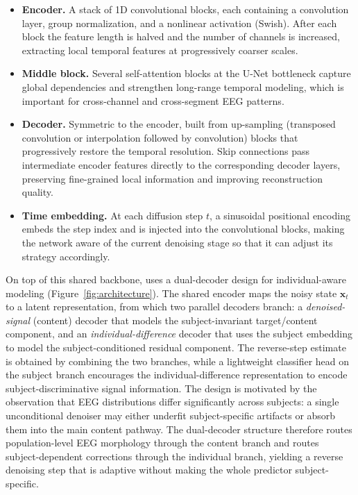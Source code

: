 \begin{itemize}
  \item \textbf{Encoder.} A stack of 1D convolutional blocks, each containing a
  convolution layer, group normalization, and a nonlinear activation (Swish).
  After each block the feature length is halved and the number of channels is
  increased, extracting local temporal features at progressively coarser scales.
  \item \textbf{Middle block.} Several self-attention blocks at the U-Net
  bottleneck capture global dependencies and strengthen long-range temporal
  modeling, which is important for cross-channel and cross-segment EEG patterns.
  \item \textbf{Decoder.} Symmetric to the encoder, built from up-sampling
  (transposed convolution or interpolation followed by convolution) blocks that
  progressively restore the temporal resolution. Skip connections pass
  intermediate encoder features directly to the corresponding decoder layers,
  preserving fine-grained local information and improving reconstruction
  quality.
  \item \textbf{Time embedding.} At each diffusion step $t$, a sinusoidal
  positional encoding embeds the step index and is injected into the
  convolutional blocks, making the network aware of the current denoising stage
  so that it can adjust its strategy accordingly.
\end{itemize}

On top of this shared backbone, \saddpm{} uses a dual-decoder design for
individual-aware modeling (Figure~\ref{fig:architecture}). The shared encoder
maps the noisy state $\mathbf{x}_t$ to a latent representation, from which two
parallel decoders branch: a \emph{denoised-signal} (content) decoder that models
the subject-invariant target/content component, and an
\emph{individual-difference} decoder that uses the subject embedding to model the
subject-conditioned residual component. The reverse-step estimate is obtained by
combining the two branches, while a lightweight classifier head on the subject
branch encourages the individual-difference representation to encode
subject-discriminative signal information. The design is motivated by the
observation that EEG distributions differ significantly across subjects: a
single unconditional denoiser may either underfit subject-specific artifacts or
absorb them into the main content pathway. The dual-decoder structure therefore
routes population-level EEG morphology through the content branch and routes
subject-dependent corrections through the individual branch, yielding a reverse
denoising step that is adaptive without making the whole predictor
subject-specific.

